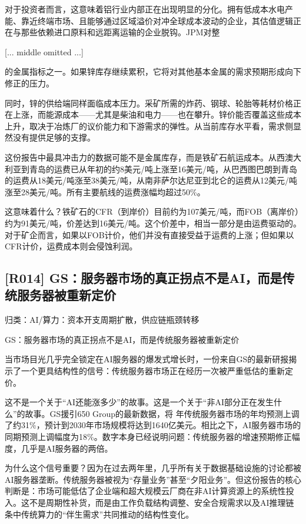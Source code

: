 \documentclass[11pt]{ctexart}
\begin{document}
对于投资者而言，这意味着铝行业内部正在出现明显的分化。拥有低成本水电产能、靠近终端市场、且能够通过区域溢价对冲全球成本波动的企业，其估值逻辑正在与那些依赖进口原料和远距离运输的企业脱钩。JPM对整

[... middle omitted ...]

的金属指标之一。如果锌库存继续累积，它将对其他基本金属的需求预期形成向下修正的压力。

同时，锌的供给端同样面临成本压力。采矿所需的炸药、钢球、轮胎等耗材价格正在上涨，而能源成本——尤其是柴油和电力——也在攀升。锌价能否覆盖这些成本上升，取决于冶炼厂的议价能力和下游需求的弹性。从当前库存水平看，需求侧显然没有提供足够的支撑。

这份报告中最具冲击力的数据可能不是金属库存，而是铁矿石航运成本。从西澳大利亚到青岛的运费已从年初的约8美元/吨上涨至16美元/吨，从巴西图巴朗到青岛的运费从18美元/吨涨至38美元/吨，从南非萨尔达尼亚到北仑的运费从12美元/吨涨至28美元/吨。所有主要航线的运费涨幅均超过50\%。

这意味着什么？铁矿石的CFR（到岸价）目前约为107美元/吨，而FOB（离岸价）约为91美元/吨，价差达到16美元/吨。这个价差中，相当一部分是由运费驱动的。对于矿企而言，如果以FOB计价，他们并没有直接受益于运费的上涨；但如果以CFR计价，运费成本则会侵蚀利润。

\subsection{[R014] GS：服务器市场的真正拐点不是AI，而是传统服务器被重新定价}
{\small\color{refgray}归类：AI/算力：资本开支周期扩散，供应链瓶颈转移}

GS：服务器市场的真正拐点不是AI，而是传统服务器被重新定价

当市场目光几乎完全锁定在AI服务器的爆发式增长时，一份来自GS的最新研报揭示了一个更具结构性的信号：传统服务器市场正在经历一次被严重低估的重新定价。

这不是一个关于“AI还能涨多少”的故事。这是一个关于“非AI部分正在发生什么”的故事。GS援引650 Group的最新数据，将 年传统服务器市场的年均预测上调了约31\%，预计到2030年市场规模将达到1640亿美元。相比之下，AI服务器市场的同期预测上调幅度为18\%。数字本身已经说明问题：传统服务器的增速预期修正幅度，几乎是AI服务器的两倍。

为什么这个信号重要？因为在过去两年里，几乎所有关于数据基础设施的讨论都被AI服务器垄断。传统服务器被视为“存量业务”甚至“夕阳业务”。但这份报告的核心判断是：市场可能低估了企业端和超大规模云厂商在非AI计算资源上的系统性投入。这不是周期性补货，而是由工作负载结构调整、安全合规需求以及AI推理链条中传统算力的“伴生需求”共同推动的结构性变化。
\end{document}
